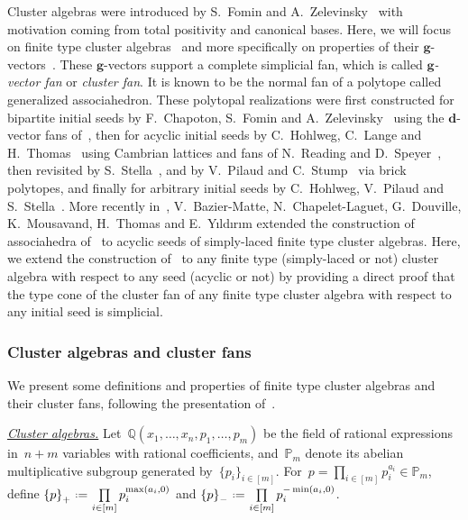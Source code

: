 \documentclass{amsart}
\theoremstyle{definition}
\newcommand{\Q}{\mathbb{Q}} %
\renewcommand{\b}[1]{{\boldsymbol{#1}}} %
\newcommand{\eqdef}{\mbox{\,\raisebox{0.2ex}{\scriptsize\ensuremath{\mathrm:}}\ensuremath{=}\,}} %
\newcommand{\darkblue}{\color{darkblue}} %
\newcommand{\defn}[1]{\textsl{\darkblue #1}} %
\newcommand{\para}[1]{\medskip\noindent\uline{\textit{#1.}}} %
\newcommand{\Trop}[1]{\mathbb{P}_{#1}} %
\newcommand{\positiveExponents}[1]{\left\{#1\right\}_+} %
\newcommand{\negativeExponents}[1]{\left\{#1\right\}_-} %
\begin{document}
Cluster algebras were introduced by S.~Fomin and A.~Zelevinsky~\cite{FominZelevinsky-ClusterAlgebrasI} with motivation coming from total positivity and canonical bases.
Here, we will focus on finite type cluster algebras~\cite{FominZelevinsky-ClusterAlgebrasII} and more specifically on properties of their $\b{g}$-vectors~\cite{FominZelevinsky-ClusterAlgebrasIV}.
These $\b{g}$-vectors support a complete simplicial fan, which is called \defn{$\b{g}$-vector fan} or \defn{cluster fan}. It is known to be the normal fan of a polytope called generalized associahedron. These polytopal realizations were first constructed for bipartite initial seeds by F.~Chapoton, S.~Fomin and A.~Zelevinsky~\cite{ChapotonFominZelevinsky} using the $\b{d}$-vector fans of~\cite{FominZelevinsky-YSystems}, then for acyclic initial seeds by C.~Hohlweg, C.~Lange and H.~Thomas~\cite{HohlwegLangeThomas} using Cambrian lattices and fans of N.~Reading and D.~Speyer~\cite{Reading-CambrianLattices, ReadingSpeyer}, then revisited by S.~Stella~\cite{Stella}, and by V.~Pilaud and C.~Stump~\cite{PilaudStump-brickPolytope} via brick polytopes, and finally for arbitrary initial seeds by C.~Hohlweg, V.~Pilaud and S.~Stella~\cite{HohlwegPilaudStella}.
More recently in~\cite{BazierMatteChapelierLaguetDouvilleMousavandThomasYildirim}, V.~Bazier-Matte, N.~Chapelet-Laguet, G.~Douville, K.~Mousavand, H.~Thomas and E.~Y\i ld\i r\i m extended the construction of associahedra of~\cite[Sect.~3.2]{ArkaniHamedBaiHeYan} to acyclic seeds of simply-laced finite type cluster algebras.
Here, we extend the construction of~\cite[Sect.~3.2]{ArkaniHamedBaiHeYan} to any finite type (simply-laced or not) cluster algebra with respect to any seed (acyclic or not) by providing a direct proof that the type cone of the cluster fan of any finite type cluster algebra with respect to any initial seed is simplicial.


\subsubsection{Cluster algebras and cluster fans}

We present some definitions and properties of finite type cluster algebras and their cluster fans, following the presentation of~\cite{HohlwegPilaudStella}.

\para{Cluster algebras}
%
Let~$\Q(x_1, \dots, x_n, p_1, \dots, p_m)$ be the field of rational expressions in~$n+m$ variables with rational coefficients, and~$\Trop{m}$ denote its abelian multiplicative subgroup generated by~$\{p_i\}_{i \in [m]}$.
For~$p = \prod\limits_{i \in [m]} p_i^{a_i} \in \Trop{m}$, define
\(
\positiveExponents{p} \eqdef \prod\limits_{i \in [m]} p_i^{\max(a_i,0)}
\)
and
\(
\negativeExponents{p} \eqdef \prod\limits_{i \in [m]} p_i^{-\min(a_i,0)}
\).
\end{document}
